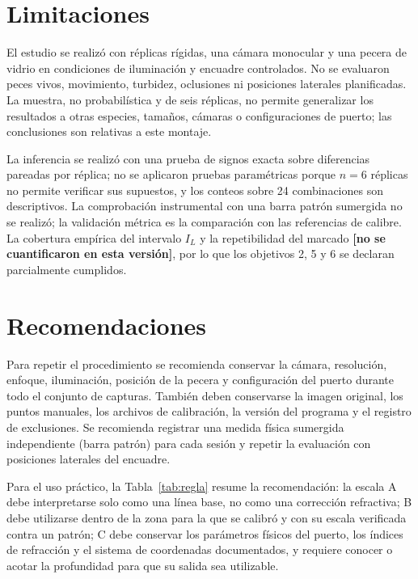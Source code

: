 \documentclass{report}
\newcommand{\IL}{I_L}
\newcommand{\pend}[1]{\textbf{[#1]}}
\begin{document}
\section{Limitaciones}

El estudio se realizó con réplicas rígidas, una cámara monocular y una pecera de vidrio en condiciones de iluminación y encuadre controlados. No se evaluaron peces vivos, movimiento, turbidez, oclusiones ni posiciones laterales planificadas. La muestra, no probabilística y de seis réplicas, no permite generalizar los resultados a otras especies, tamaños, cámaras o configuraciones de puerto; las conclusiones son relativas a este montaje.

La inferencia se realizó con una prueba de signos exacta sobre diferencias pareadas por réplica; no se aplicaron pruebas paramétricas porque $n = 6$ réplicas no permite verificar sus supuestos, y los conteos sobre 24 combinaciones son descriptivos. La comprobación instrumental con una barra patrón sumergida no se realizó; la validación métrica es la comparación con las referencias de calibre. La cobertura empírica del intervalo $\IL$ y la repetibilidad del marcado \pend{no se cuantificaron en esta versión}, por lo que los objetivos 2, 5 y 6 se declaran parcialmente cumplidos.

\section{Recomendaciones}

Para repetir el procedimiento se recomienda conservar la cámara, resolución, enfoque, iluminación, posición de la pecera y configuración del puerto durante todo el conjunto de capturas. También deben conservarse la imagen original, los puntos manuales, los archivos de calibración, la versión del programa y el registro de exclusiones. Se recomienda registrar una medida física sumergida independiente (barra patrón) para cada sesión y repetir la evaluación con posiciones laterales del encuadre.

Para el uso práctico, la Tabla~\ref{tab:regla} resume la recomendación: la escala A debe interpretarse solo como una línea base, no como una corrección refractiva; B debe utilizarse dentro de la zona para la que se calibró y con su escala verificada contra un patrón; C debe conservar los parámetros físicos del puerto, los índices de refracción y el sistema de coordenadas documentados, y requiere conocer o acotar la profundidad para que su salida sea utilizable.
\end{document}
